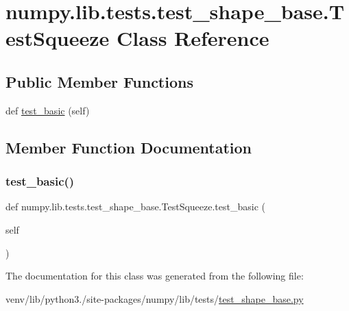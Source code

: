 \hypertarget{classnumpy_1_1lib_1_1tests_1_1test__shape__base_1_1TestSqueeze}{}\section{numpy.\+lib.\+tests.\+test\+\_\+shape\+\_\+base.\+Test\+Squeeze Class Reference}
\label{classnumpy_1_1lib_1_1tests_1_1test__shape__base_1_1TestSqueeze}
\subsection*{Public Member Functions}
\begin{DoxyCompactItemize}
\item 
def \hyperlink{classnumpy_1_1lib_1_1tests_1_1test__shape__base_1_1TestSqueeze_ae57a83524c59dde0187c4c0e0c612e28}{test\+\_\+basic} (self)
\end{DoxyCompactItemize}


\subsection{Member Function Documentation}
\mbox{\label{classnumpy_1_1lib_1_1tests_1_1test__shape__base_1_1TestSqueeze_ae57a83524c59dde0187c4c0e0c612e28}} 
\subsubsection{\texorpdfstring{test\+\_\+basic()}{test\_basic()}}
{\footnotesize\ttfamily def numpy.\+lib.\+tests.\+test\+\_\+shape\+\_\+base.\+Test\+Squeeze.\+test\+\_\+basic (\begin{DoxyParamCaption}\item[{}]{self }\end{DoxyParamCaption})}



The documentation for this class was generated from the following file\+:\begin{DoxyCompactItemize}
\item 
venv/lib/python3./site-\/packages/numpy/lib/tests/\hyperlink{lib_2tests_2test__shape__base_8py}{test\+\_\+shape\+\_\+base.\+py}\end{DoxyCompactItemize}
